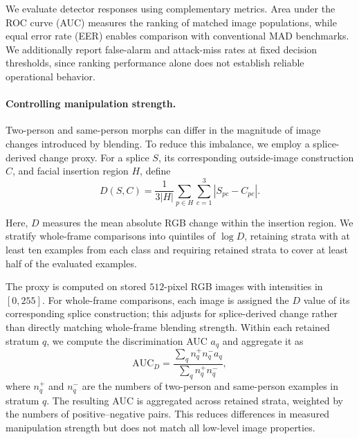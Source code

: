 We evaluate detector responses using complementary
metrics. Area under the ROC curve (AUC) measures the
ranking of matched image populations, while equal error
rate (EER) enables comparison with conventional MAD
benchmarks. We additionally report false-alarm and
attack-miss rates at fixed decision thresholds, since
ranking performance alone does not establish reliable
operational behavior.

\paragraph{Controlling manipulation strength.}
Two-person and same-person morphs can differ in the
magnitude of image changes introduced by blending.
To reduce this imbalance, we employ a splice-derived
change proxy. For a splice $S$, its corresponding
outside-image construction $C$, and facial insertion
region $H$, define
\begin{equation}
    D(S,C) =
    \frac{1}{3|H|}
    \sum_{p \in H}
    \sum_{c=1}^{3}
    |S_{pc}-C_{pc}|.
    \label{eq:splice_difference}
\end{equation}

Here, $D$ measures the mean absolute RGB change within
the insertion region. We stratify whole-frame comparisons
into quintiles of $\log D$, retaining strata with at
least ten examples from each class and requiring retained
strata to cover at least half of the evaluated examples.


The proxy is computed on stored $512$-pixel RGB images
with intensities in $[0,255]$. For whole-frame
comparisons, each image is assigned the $D$ value of
its corresponding splice construction; this adjusts
for splice-derived change rather than directly matching
whole-frame blending strength. Within each retained stratum $q$, we compute the
discrimination AUC $a_q$ and aggregate it as
\begin{equation}
    \mathrm{AUC}_{D} =
    \frac{\sum_q n_q^{+}n_q^{-}a_q}
         {\sum_q n_q^{+}n_q^{-}},
    \label{eq:stratified_auc}
\end{equation}
where $n_q^{+}$ and $n_q^{-}$ are the numbers of
two-person and same-person examples in stratum $q$.
The resulting AUC is aggregated across retained strata,
weighted by the numbers of positive--negative pairs.
This reduces differences in measured manipulation
strength but does not match all low-level image properties.



